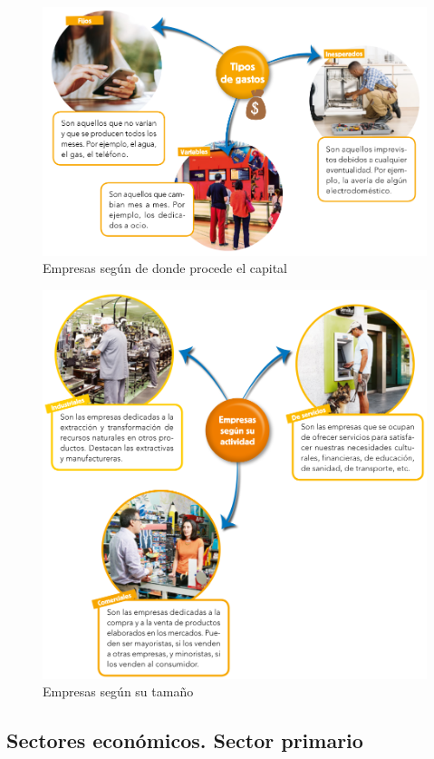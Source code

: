 \begin{figure}[!ht]
    \centering
    \includegraphics[width=0.8\linewidth]{Tema4/01_Tipos_gastos.png}
    \caption{Empresas según de donde procede el capital}
    \label{fig:empresas-capital}
\end{figure}

\begin{figure}[!ht]
    \centering
    \includegraphics[width=0.8\linewidth]{Tema4/02_Empresas_actividad.png}
    \caption{Empresas según su tamaño}
    \label{fig:empresas-tamaño}
\end{figure}

\subsection{Sectores económicos. Sector primario}